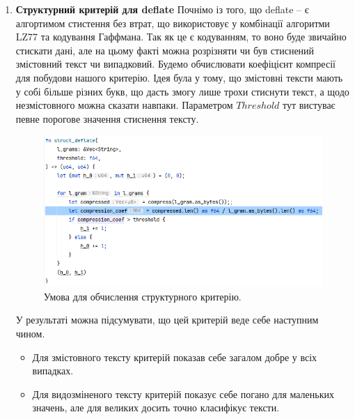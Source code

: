 \begin{enumerate}
    \item \textbf{Структурний критерій для deflate}
        Почнімо із того, що deflate -- є алгортимом стистення без втрат, що використовує у комбінації алгоритми LZ77 та кодування Гаффмана. Так як це є кодуванням, то воно буде звичайно стискати дані, але на цьому факті можна розрізняти чи був стиснений змістовний текст чи випадковий. Будемо обчислювати коефіцієнт компресії для побудови нашого критерію. Ідея була у тому, що змістовні тексти мають у собі більше різних букв, що дасть змогу лише трохи стиснути текст, а щодо незмістовного можна сказати навпаки. Параметром $Threshold$ тут вистуває певне порогове значення стиснення тексту.

        \begin{figure}[!h]
            \centering
            \includegraphics[width=0.5\linewidth]{Images/deflate_algorithm.png}
            \caption{Умова для обчислення структурного критерію.}
            \label{fig:deflate_algorithm}
        \end{figure}

         У результаті можна підсумувати, що цей критерій веде себе наступним чином.
        \begin{itemize}
            \item Для змістовного тексту критерій показав себе загалом добре у всіх випадках.
            \item Для видозміненого тексту критерій показує себе погано для маленьких значень, але для великих досить точно класифікує тексти. 
        \end{itemize}
\end{enumerate}




